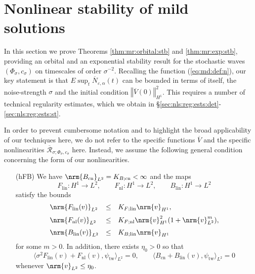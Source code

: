 \documentclass[10pt]{articleHJ}
\newcommand{\e}{\ensuremath{\varepsilon}}
\DeclarePairedDelimiter{\nrm}\lVert\rVert
\newcommand{\norm}[1]{\left\Vert#1\right\Vert}		%
\newcommand{\sref}[1]{(\ref{#1})}                       %
\numberwithin{equation}{section}
\begin{document}
\section{Nonlinear stability of mild solutions}
\label{sec:nls}

In this section we
prove Theorems \ref{thm:mr:orbital:stb} and \ref{thm:mr:exp:stb},
providing an  orbital and an exponential stability result
for the stochastic waves $(\Phi_{\sigma}, c_{\sigma})$ on timescales
of order $\sigma^{-2}$.
Recalling the function
\sref{eq:md:def:n},
our key statement is that
 $E \sup_{t} \overline{N}_{\e,\alpha}(t)$
can be bounded in terms of itself, the noise-strength $\sigma$
and the initial condition $\norm{\overline{V}(0)}_{H^1}^2$.
This requires a number of technical regularity estimates,
which we obtain in \S\ref{sec:nls:reg:ests:det}-\ref{sec:nls:reg:ests:st}.


In order to prevent cumbersome notation and to
highlight the broad applicability of our techniques here,
we do not refer to the specific functions $\overline{V}$
and the specific nonlinearities
$\overline{\mathcal{R}}_{\sigma;\Phi_{\sigma}, c_{\sigma}}$
here. Instead, we assume the
following general condition
concerning the form of our nonlinearities.
\begin{itemize}
\item[(hFB)]
We have $\nrm{B_{\mathrm{cn}}}_{L^2}=K_{B;\mathrm{cn}}<\infty$ and the maps
\begin{equation}
F_{\mathrm{lin}} : H^1 \to L^2,
\qquad
F_{\mathrm{nl}} : H^1 \to L^2,
\qquad
B_{\mathrm{lin}} : H^1 \to L^2
\end{equation}
satisfy the bounds
\begin{equation}
\begin{array}{lcl}
\nrm{F_{\mathrm{lin}}(v)}_{L^2}&\leq& K_{F;\mathrm{lin}}\nrm{v}_{H^1},
  \\[0.2cm]
\nrm{F_{\mathrm{nl}}(v)}_{L^2}&\leq & K_{F;\mathrm{nl}}\nrm{v}^2_{H^1}(1+\nrm{v}_{L^2}^{m}),
  \\[0.2cm]
\nrm{B_{\mathrm{lin}}(v)}_{L^2}&\leq&  K_{B;\mathrm{lin}}\nrm{v}_{H^1}
\end{array}
\end{equation}
for some $m > 0$.
In addition, there exists $\eta_0 > 0$
so that
\begin{equation}
\label{eq:nls:projs:are:zero}
\langle \sigma^2 F_{\mathrm{lin}}(v) + F_{\mathrm{nl}}(v) , \psi_{\mathrm{tw}} \rangle_{L^2}
 = 0,
\qquad
\langle  B_{\mathrm{cn}} + B_{\mathrm{lin}}(v) , \psi_{\mathrm{tw}} \rangle_{L^2}
 = 0
\end{equation}
whenever
$\nrm{v}_{L^2}\leq \eta_0$.
\end{itemize}
\end{document}
